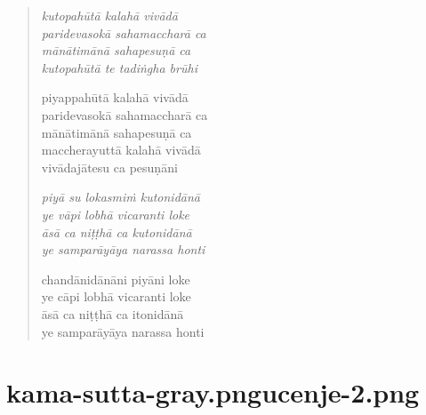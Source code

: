 

\cleartoverso

\vspace*{30mm}

\begin{verse}

\emph{kutopahūtā kalahā vivādā\\
paridevasokā sahamaccharā ca}\\
\emph{mānātimānā sahapesuṇā ca\\
kutopahūtā te tadiṅgha brūhi}

piyappahūtā kalahā vivādā\\
paridevasokā sahamaccharā ca\\
mānātimānā sahapesuṇā ca\\
maccherayuttā kalahā vivādā\\
vivādajātesu ca pesuṇāni

\emph{piyā su lokasmiṁ kutonidānā\\
ye vāpi lobhā vicaranti loke}\\
\emph{āsā ca niṭṭhā ca kutonidānā\\
ye samparāyāya narassa honti}

chandānidānāni piyāni loke\\
ye cāpi lobhā vicaranti loke\\
āsā ca niṭṭhā ca itonidānā\\
ye samparāyāya narassa honti

\end{verse}


\chapter[Kalahavivāda Sutta]{{kama-sutta-gray.png}{ucenje-2.png}}

